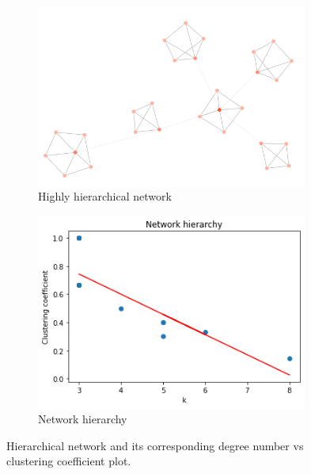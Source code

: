 \begin{figure}
    \centering
    \begin{subfigure}{0.49\textwidth}
        \centering
        \includegraphics[width=0.98\textwidth]{figures/hierarchical.png}
        \caption{Highly hierarchical network}
        \label{fig:hierarchical}
    \end{subfigure}
    \hfill
    \begin{subfigure}{0.49\textwidth}
        \centering
        \includegraphics[width=0.98\textwidth]{figures/hierarchy_plot.png}
        \caption{Network hierarchy}
        \label{fig:hierarchy plot}
    \end{subfigure}
    \caption{Hierarchical network and its corresponding degree number vs clustering coefficient plot.}
    \label{fig:hierarchy}
\end{figure}

